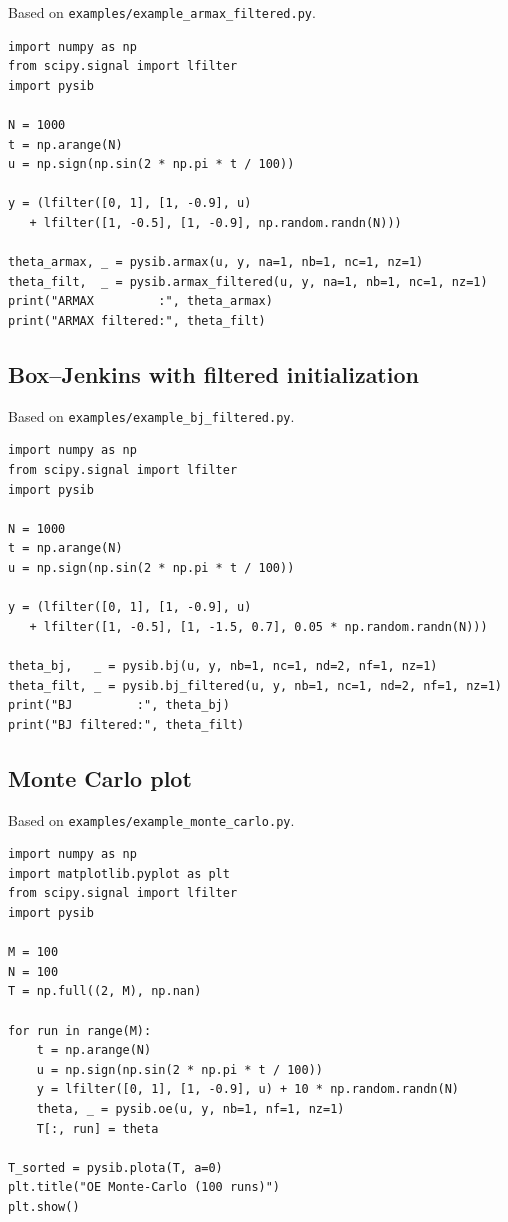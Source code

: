 \documentclass[11pt,a4paper]{article}
\begin{document}
Based on \texttt{examples/example\_armax\_filtered.py}.

\begin{lstlisting}
import numpy as np
from scipy.signal import lfilter
import pysib

N = 1000
t = np.arange(N)
u = np.sign(np.sin(2 * np.pi * t / 100))

y = (lfilter([0, 1], [1, -0.9], u)
   + lfilter([1, -0.5], [1, -0.9], np.random.randn(N)))

theta_armax, _ = pysib.armax(u, y, na=1, nb=1, nc=1, nz=1)
theta_filt,  _ = pysib.armax_filtered(u, y, na=1, nb=1, nc=1, nz=1)
print("ARMAX         :", theta_armax)
print("ARMAX filtered:", theta_filt)
\end{lstlisting}

\subsection{Box--Jenkins with filtered initialization}

Based on \texttt{examples/example\_bj\_filtered.py}.

\begin{lstlisting}
import numpy as np
from scipy.signal import lfilter
import pysib

N = 1000
t = np.arange(N)
u = np.sign(np.sin(2 * np.pi * t / 100))

y = (lfilter([0, 1], [1, -0.9], u)
   + lfilter([1, -0.5], [1, -1.5, 0.7], 0.05 * np.random.randn(N)))

theta_bj,   _ = pysib.bj(u, y, nb=1, nc=1, nd=2, nf=1, nz=1)
theta_filt, _ = pysib.bj_filtered(u, y, nb=1, nc=1, nd=2, nf=1, nz=1)
print("BJ         :", theta_bj)
print("BJ filtered:", theta_filt)
\end{lstlisting}

\subsection{Monte Carlo plot}

Based on \texttt{examples/example\_monte\_carlo.py}.

\begin{lstlisting}
import numpy as np
import matplotlib.pyplot as plt
from scipy.signal import lfilter
import pysib

M = 100
N = 100
T = np.full((2, M), np.nan)

for run in range(M):
    t = np.arange(N)
    u = np.sign(np.sin(2 * np.pi * t / 100))
    y = lfilter([0, 1], [1, -0.9], u) + 10 * np.random.randn(N)
    theta, _ = pysib.oe(u, y, nb=1, nf=1, nz=1)
    T[:, run] = theta

T_sorted = pysib.plota(T, a=0)
plt.title("OE Monte-Carlo (100 runs)")
plt.show()
\end{lstlisting}
\end{document}
